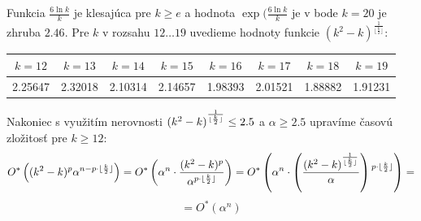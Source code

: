 Funkcia $\frac{6 \ln{k}}{k}$ je klesajúca pre $k \ge e$ a hodnota $\exp{(\frac{6 \ln{k}}{k}}$ je 
v bode $k=20$ je zhruba $2.46$. Pre $k$ v rozsahu $12 \ldots 19$ uvedieme hodnoty funkcie $(k^2 - k)^{\frac{1}{\lfloor \frac{k}{2} \rfloor}}$:

\begin{tabular}{|c | c | c | c | c | c | c | c |} \hline
$ k=12 $ & $ k=13 $ & $ k=14 $ & $ k=15 $ & $ k=16 $ & $ k=17 $ & $ k=18 $ & $ k=19 $ \\ \hline
2.25647 & 2.32018 & 2.10314 & 2.14657 & 1.98393 & 2.01521 & 1.88882 & 1.91231 \\ \hline
\end{tabular}

Nakoniec s využitím nerovnosti $(k^2 - k)\strut^{\frac{1}{\lfloor \frac{k}{2} \rfloor}} \leq 2.5$ a $\alpha \ge 2.5$
upravíme časovú zložitosť pre $k \ge 12$:
$$O^*\left((k^2 - k)^p \alpha^{n - p \cdot \lfloor \frac{k}{2} \rfloor}\right) =
O^*\left(\alpha^{n} \cdot \frac{(k^2 - k)^p}{\alpha^{p \cdot \lfloor \frac{k}{2} \rfloor}}\right) = O^*\left(\alpha^n \cdot \left(\frac{(k^2 - k)^{\frac{1}{\lfloor \frac{k}{2} \rfloor}}}{\alpha}\right) \strut^{p \cdot \lfloor \frac{k}{2} \rfloor}\right) = $$
$$ = O^*(\alpha^n)$$

